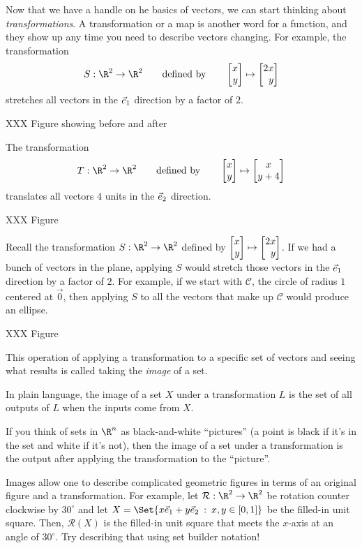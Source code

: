 Now that we have a handle on he basics of vectors, we can start thinking about \emph{transformations}.
A transformation or a map is another word for a function, and they show up any time you need to describe
vectors changing. For example, the transformation
\[
	S:\R^2\to\R^2\qquad\text{defined by}\qquad \mat{x\\y}\mapsto\mat{2x\\y}
\]
stretches all vectors in the ${\vec e_1}$ direction by a factor of $2$.

XXX Figure showing before and after

The transformation
\[
	T:\R^2\to\R^2\qquad\text{defined by}\qquad \mat{x\\y}\mapsto\matc{x\\y+4}
\]
translates all vectors $4$ units in the ${\vec e_2}$ direction.

XXX Figure


Recall the transformation $S:\R^2\to\R^2$ defined by $\mat{x\\y}\mapsto\mat{2x\\y}$.
If we had a bunch of vectors in the plane, applying $S$ would stretch those vectors in
the ${\vec e_1}$ direction by a factor of $2$. For example, if we start with $\mathcal C$, the circle of radius $1$
centered at $\vec 0$, then applying $S$ to all the vectors that make up $\mathcal C$ would produce an ellipse.

XXX Figure

This operation of applying a transformation to a specific set of vectors and seeing what results is
called taking the \emph{image} of a set.


In plain language, the image of a set $X$ under a transformation $L$ is the set of all outputs of
$L$ when the inputs come from $X$.

If you think of sets in $\R^n$ as black-and-white ``pictures'' (a point is black if it's in the set
and white if it's not), then the image of a set under a transformation is the output after applying the
transformation to the ``picture''.

Images allow one to describe complicated geometric figures in terms of an original figure and a transformation.
For example, let $\mathcal R:\R^2\to\R^2$ be rotation counter clockwise by $30^\circ$
and let $X=\Set{x\xhat+y\yhat\given x,y\in[0,1]}$ be the filled-in unit square. Then, $\mathcal R(X)$ is the filled-in
unit square that meets the $x$-axis at an angle of $30^\circ$. Try describing that using set builder notation!

